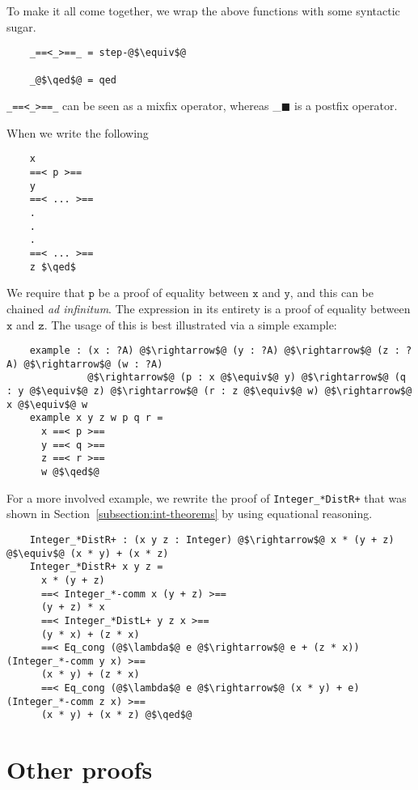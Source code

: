 \documentclass[12pt,twoside,maitrise]{dms}
\theoremstyle{definition}
\numberwithin{equation}{section}
\numberwithin{table}{chapter}
\numberwithin{figure}{chapter}
\newcommand\id[1] {\texttt{#1}}
\newcommand\latinphrase{\textit}
\renewcommand\qed{\blacksquare}
\begin{document}
To make it all come together, we wrap the above functions with some syntactic
sugar.

\begin{verbatim}
    _==<_>==_ = step-@$\equiv$@

    _@$\qed$@ = qed
\end{verbatim}

\verb|_==<_>==_| can be seen as a mixfix operator, whereas \_$\qed$ is a postfix
operator.

When we write the following

\begin{lstlisting}
    x
    ==< p >==
    y
    ==< ... >==
    .
    .
    .
    ==< ... >==
    z $\qed$
\end{lstlisting}

We require that $\id{p}$ be a proof of equality between $\id{x}$ and $\id{y}$, and this can be chained \latinphrase{ad infinitum}. The expression in its entirety is a proof of equality between $\id{x}$ and $\id{z}$. The usage of this is best illustrated via a simple example:

\begin{verbatim}
    example : (x : ?A) @$\rightarrow$@ (y : ?A) @$\rightarrow$@ (z : ?A) @$\rightarrow$@ (w : ?A)
              @$\rightarrow$@ (p : x @$\equiv$@ y) @$\rightarrow$@ (q : y @$\equiv$@ z) @$\rightarrow$@ (r : z @$\equiv$@ w) @$\rightarrow$@ x @$\equiv$@ w
    example x y z w p q r =
      x ==< p >==
      y ==< q >==
      z ==< r >==
      w @$\qed$@
\end{verbatim}

For a more involved example, we rewrite the proof of \verb|Integer_*DistR+| that was shown in Section~\ref{subsection:int-theorems} by using equational reasoning.

\begin{verbatim}
    Integer_*DistR+ : (x y z : Integer) @$\rightarrow$@ x * (y + z) @$\equiv$@ (x * y) + (x * z)
    Integer_*DistR+ x y z =
      x * (y + z)
      ==< Integer_*-comm x (y + z) >==
      (y + z) * x
      ==< Integer_*DistL+ y z x >==
      (y * x) + (z * x)
      ==< Eq_cong (@$\lambda$@ e @$\rightarrow$@ e + (z * x)) (Integer_*-comm y x) >==
      (x * y) + (z * x)
      ==< Eq_cong (@$\lambda$@ e @$\rightarrow$@ (x * y) + e) (Integer_*-comm z x) >==
      (x * y) + (x * z) @$\qed$@
\end{verbatim}

\chapter{Other proofs}\label{app:other-proofs}
\end{document}
